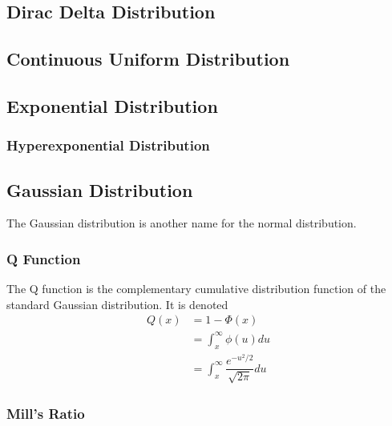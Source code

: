 \documentclass[11pt]{report} %
\begin{document}
\subsection{Dirac Delta Distribution}

\subsection{Continuous Uniform Distribution}

\subsection{Exponential Distribution}

\subsubsection{Hyperexponential Distribution}

\subsection{Gaussian Distribution}

The Gaussian distribution is another name for the normal distribution.

\subsubsection{Q Function}

The Q function is the complementary cumulative distribution function of the standard Gaussian distribution. It is denoted
\begin{align}
Q\left(x\right) &= 1 - \Phi\left(x\right) \\
&= \int_{x}^{\infty}\phi\left(u\right)du \\
&= \int_{x}^{\infty}\dfrac{e^{-u^{2}/2}}{\sqrt{2\pi}}du
\end{align}

\subsubsection{Mill's Ratio}
\end{document}
